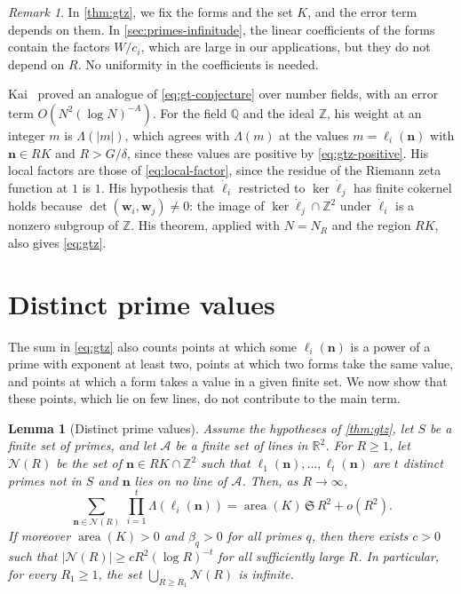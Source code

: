 \documentclass[12pt,oneside,openany]{book}
\theoremstyle{definition}
\theoremstyle{plain}
\numberwithin{equation}{chapter}
\theoremstyle{plain}
\newtheorem{lemma}[lemma]{Lemma}
\theoremstyle{definition}
\theoremstyle{remark}
\newtheorem{remark}[remark]{Remark}
\newcommand{\Q}{\mathbb Q}
\newcommand{\Z}{\mathbb Z}
\newcommand{\R}{\mathbb R}
\DeclareMathOperator{\area}{area}
\begin{document}
\begin{remark}\label{rem:gtz-fixed}
In \cref{thm:gtz}, we fix the forms and the set $K$, and the error term depends on them. In \cref{sec:primes-infinitude}, the linear coefficients of the forms contain the factors $W/c_i$, which are large in our applications, but they do not depend on $R$. No uniformity in the coefficients is needed.

Kai~\cite[Theorem~12.1]{Kai} proved an analogue of \eqref{eq:gt-conjecture} over number fields, with an error term $O(N^2(\log N)^{-A})$. For the field $\Q$ and the ideal $\Z$, his weight at an integer $m$ is $\Lambda(|m|)$, which agrees with $\Lambda(m)$ at the values $m=\ell_i(\mathbf n)$ with $\mathbf n\in RK$ and $R>G/\delta$, since these values are positive by \eqref{eq:gtz-positive}. His local factors are those of \eqref{eq:local-factor}, since the residue of the Riemann zeta function at $1$ is $1$. His hypothesis that $\dot\ell_i$ restricted to $\ker\dot\ell_j$ has finite cokernel holds because $\det(\mathbf w_i,\mathbf w_j)\ne0$: the image of $\ker\dot\ell_j\cap\Z^2$ under $\dot\ell_i$ is a nonzero subgroup of $\Z$. His theorem, applied with $N=N_R$ and the region $RK$, also gives \eqref{eq:gtz}.
\end{remark}

\section{Distinct prime values}\label{sec:primes-exclusions}

The sum in \eqref{eq:gtz} also counts points at which some $\ell_i(\mathbf n)$ is a power of a prime with exponent at least two, points at which two forms take the same value, and points at which a form takes a value in a given finite set. We now show that these points, which lie on few lines, do not contribute to the main term.

\begin{lemma}[Distinct prime values]\label{lem:prime-exclusions}
Assume the hypotheses of \cref{thm:gtz}, let $S$ be a finite set of primes, and let $\mathcal A$ be a finite set of lines in $\R^2$. For $R\ge1$, let $\mathcal N(R)$ be the set of $\mathbf n\in RK\cap\Z^2$ such that $\ell_1(\mathbf n),\dots,\ell_t(\mathbf n)$ are $t$ distinct primes not in $S$ and $\mathbf n$ lies on no line of $\mathcal A$. Then, as $R\to\infty$,
\begin{equation}\label{eq:prime-exclusions}
\sum_{\mathbf n\in\mathcal N(R)}\ \prod_{i=1}^t\Lambda(\ell_i(\mathbf n))=\area(K)\,\mathfrak S\,R^2+o(R^2).
\end{equation}
If moreover $\area(K)>0$ and $\beta_q>0$ for all primes $q$, then there exists $c>0$ such that $|\mathcal N(R)|\ge cR^2(\log R)^{-t}$ for all sufficiently large $R$. In particular, for every $R_1\ge1$, the set $\bigcup_{R\ge R_1}\mathcal N(R)$ is infinite.
\end{lemma}
\end{document}
